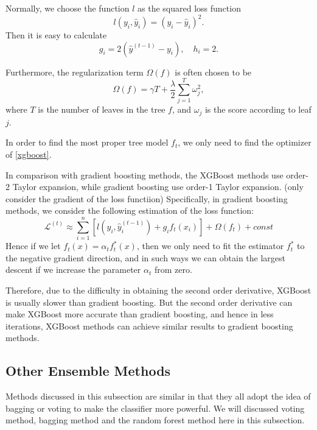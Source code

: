 \documentclass[english]{article}
\begin{document}
\par Normally, we choose the function $l$ as the squared loss function
\begin{equation}
	l(y_{i}, \hat{y}_{i}) = (y_{i} - \hat{y}_{i})^{2}.
\end{equation}
Then it is easy to calculate 
\begin{equation}
	g_{i} = 2(\hat{y}^{(t-1)} - y_{i}), \quad h_{i} = 2.
\end{equation}
\par Furthermore, the regularization term $\Omega(f)$ is often chosen to be
\begin{equation}
	\Omega(f) = \gamma T + \frac{\lambda}{2}\sum_{j=1}^{T}\omega_{j}^{2},
\end{equation}
where $T$ is the number of leaves in the tree $f$, and $\omega_{j}$ is the score according to leaf $j$.
\par In order to find the most proper tree model $f_{t}$, we only need to find the optimizer of \eqref{xgboost}.
\par In comparison with gradient boosting methods, the XGBoost methods use order-2 Taylor expansion, while gradient boosting use order-1 Taylor expansion. (only consider the gradient of the loss functiion) Specifically, in gradient boosting methods, we consider the following estimation of the loss function:
\begin{equation}
	\mathcal{L}^{(t)}\approx\sum_{i=1}^{n}\left[l(y_{i}, \hat{y}_{i}^{(t-1)}) + g_{i}f_{t}(x_{i})\right] + \Omega(f_{t}) + const
\end{equation}
Hence if we let $f_{t}(x) = \alpha_{t}f_{t}^{*}(x)$, then we only need to fit the estimator $f_{t}^{*}$ to the negative gradient direction, and in such ways we can obtain the largest descent if we increase the parameter $\alpha_{t}$ from zero.
\par Therefore, due to the difficulty in obtaining the second order derivative, XGBoost is usually slower than gradient boosting. But the second order derivative can make XGBoost more accurate than gradient boosting, and hence in less iterations, XGBoost methods can achieve similar results to gradient boosting methods.

\subsection{Other Ensemble Methods}
\par Methods discussed in this subsection are similar in that they all adopt the idea of bagging or voting to make the classifier more powerful. We will discussed voting method, bagging method and the random forest method here in this subsection.
\end{document}

